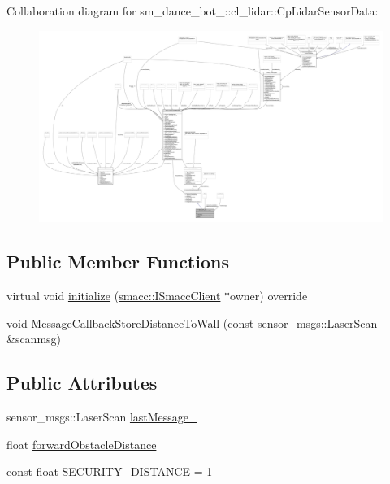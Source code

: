 Collaboration diagram for sm\+\_\+dance\+\_\+bot\+\_\+:\+:cl\+\_\+lidar\+:\+:Cp\+Lidar\+Sensor\+Data\+:
\nopagebreak
\begin{figure}[H]
\begin{center}
\leavevmode
\includegraphics[width=350pt]{classsm__dance__bot__3_1_1cl__lidar_1_1CpLidarSensorData__coll__graph}
\end{center}
\end{figure}
\subsection*{Public Member Functions}
\begin{DoxyCompactItemize}
\item 
virtual void \hyperlink{classsm__dance__bot__3_1_1cl__lidar_1_1CpLidarSensorData_a0ed4f4e9ae3d044283115bcd53c505d9}{initialize} (\hyperlink{classsmacc_1_1ISmaccClient}{smacc\+::\+I\+Smacc\+Client} $\ast$owner) override
\item 
void \hyperlink{classsm__dance__bot__3_1_1cl__lidar_1_1CpLidarSensorData_a4aa6fd496a7cbf2703578b40295d8993}{Message\+Callback\+Store\+Distance\+To\+Wall} (const sensor\+\_\+msgs\+::\+Laser\+Scan \&scanmsg)
\end{DoxyCompactItemize}
\subsection*{Public Attributes}
\begin{DoxyCompactItemize}
\item 
sensor\+\_\+msgs\+::\+Laser\+Scan \hyperlink{classsm__dance__bot__3_1_1cl__lidar_1_1CpLidarSensorData_af1cae89e2fd815902b474b744d03afbe}{last\+Message\+\_\+}
\item 
float \hyperlink{classsm__dance__bot__3_1_1cl__lidar_1_1CpLidarSensorData_a2a86693368da89990b9c82c27d3d9e8f}{forward\+Obstacle\+Distance}
\item 
const float \hyperlink{classsm__dance__bot__3_1_1cl__lidar_1_1CpLidarSensorData_a3510efc41a0ff87203041ec094fec54b}{S\+E\+C\+U\+R\+I\+T\+Y\+\_\+\+D\+I\+S\+T\+A\+N\+CE} = 1
\end{DoxyCompactItemize}
